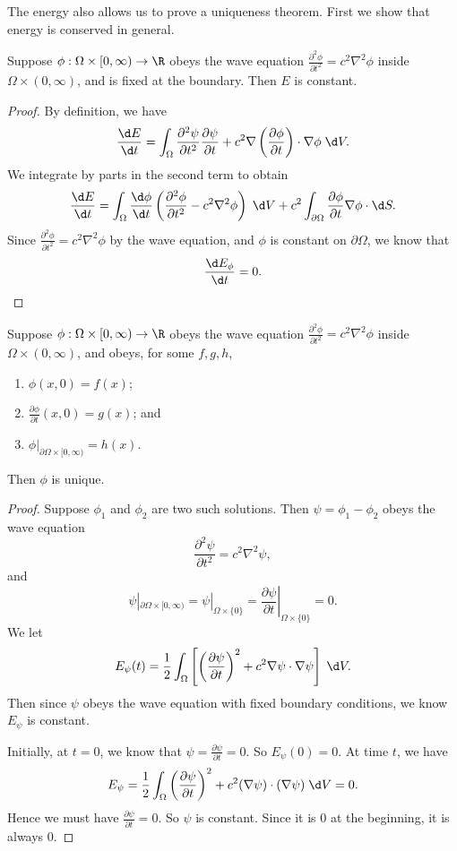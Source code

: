 \documentclass[a4paper]{article}
\begin{document}
The energy also allows us to prove a uniqueness theorem. First we show that energy is conserved in general.

\begin{prop}
  Suppose $\phi: \Omega \times [0, \infty) \to \R$ obeys the wave equation $\frac{\partial^2 \phi}{\partial t^2} = c^2 \nabla^2 \phi$ inside $\Omega \times (0, \infty)$, and is fixed at the boundary. Then $E$ is constant.
\end{prop}

\begin{proof}
  By definition, we have
  \[
    \frac{\d E}{\d t} = \int_\Omega \frac{\partial^2 \psi}{\partial t^2}\frac{\partial \psi}{\partial t} + c^2 \nabla \left(\frac{\partial \phi}{\partial t}\right)\cdot \nabla \phi \;\d V.
  \]
  We integrate by parts in the second term to obtain
  \[
    \frac{\d E}{\d t} = \int_\Omega \frac{\d \phi}{\d t}\left(\frac{\partial^2 \phi}{\partial t^2} - c^2 \nabla^2 \phi\right)\;\d V + c^2 \int_{\partial \Omega} \frac{\partial \phi}{\partial t}\nabla \phi \cdot \d S.
  \]
  Since $\frac{\partial^2 \phi}{\partial t^2} = c^2 \nabla^2 \phi$ by the wave equation, and $\phi$ is constant on $\partial \Omega$, we know that
  \[
    \frac{\d E_\phi}{\d t} = 0.
  \]
\end{proof}

\begin{prop}
  Suppose $\phi: \Omega \times [0, \infty) \to \R$ obeys the wave equation $\frac{\partial^2 \phi}{\partial t^2} = c^2 \nabla^2 \phi$ inside $\Omega \times (0, \infty)$, and obeys, for some $f, g, h$,
  \begin{enumerate}
    \item $\phi(x, 0) = f(x)$;
    \item $\frac{\partial \phi}{\partial t}(x, 0) = g(x)$; and
    \item $\phi|_{\partial \Omega\times [0, \infty)} = h(x)$.
  \end{enumerate}
  Then $\phi$ is unique.
\end{prop}
\begin{proof}
  Suppose $\phi_1$ and $\phi_2$ are two such solutions. Then $\psi = \phi_1 - \phi_2$ obeys the wave equation
  \[
    \frac{\partial^2 \psi}{\partial t^2} = c^2 \nabla^2 \psi,
  \]
  and
  \[
    \psi|_{\partial \Omega \times [0, \infty)} = \psi|_{\Omega \times \{0\}} = \left.\frac{\partial \psi}{\partial t}\right|_{\Omega \times \{0\}} = 0.
  \]
  We let
  \[
    E_\psi(t) = \frac{1}{2}\int_\Omega \left[\left(\frac{\partial \psi}{\partial t}\right)^2 + c^2 \nabla \psi \cdot \nabla \psi\right] \;\d V.
  \]
  Then since $\psi$ obeys the wave equation with fixed boundary conditions, we know $E_\psi$ is constant.

  Initially, at $t = 0$, we know that $\psi = \frac{\partial \psi}{\partial t} = 0$. So $E_\psi(0) = 0$. At time $t$, we have
  \[
    E_\psi = \frac{1}{2}\int_\Omega \left(\frac{\partial \psi}{\partial t}\right)^2 + c^2 (\nabla \psi)\cdot (\nabla \psi) \;\d V = 0.
  \]
  Hence we must have $\frac{\partial \psi}{\partial t} = 0$. So $\psi$ is constant. Since it is $0$ at the beginning, it is always $0$.
\end{proof}
\end{document}
